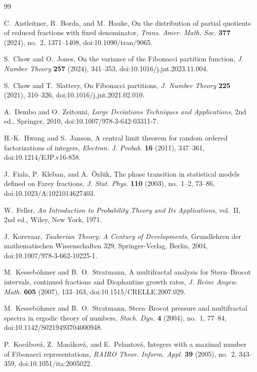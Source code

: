 \begin{thebibliography}{99}

C.~Aistleitner, B.~Borda, and M.~Hauke,
On the distribution of partial quotients of reduced fractions with fixed
denominator,
\textit{Trans. Amer. Math. Soc.} \textbf{377} (2024), no.~2, 1371--1408,
doi:10.1090/tran/9065.

S.~Chow and O.~Jones,
On the variance of the Fibonacci partition function,
\textit{J. Number Theory} \textbf{257} (2024), 341--353,
doi:10.1016/j.jnt.2023.11.004.

S.~Chow and T.~Slattery,
On Fibonacci partitions,
\textit{J. Number Theory} \textbf{225} (2021), 310--326,
doi:10.1016/j.jnt.2021.02.010.

A.~Dembo and O.~Zeitouni,
\textit{Large Deviations Techniques and Applications},
2nd ed., Springer, 2010,
doi:10.1007/978-3-642-03311-7.

H.-K.~Hwang and S.~Janson,
A central limit theorem for random ordered factorizations of integers,
\textit{Electron. J. Probab.} \textbf{16} (2011), 347--361,
doi:10.1214/EJP.v16-858.

J.~Fiala, P.~Kleban, and A.~\"Ozl\"uk,
The phase transition in statistical models defined on Farey fractions,
\textit{J. Stat. Phys.} \textbf{110} (2003), no.~1--2, 73--86,
doi:10.1023/A:1021014627403.

W.~Feller,
\textit{An Introduction to Probability Theory and Its Applications}, vol.~II,
2nd ed., Wiley, New York, 1971.

J.~Korevaar,
\textit{Tauberian Theory: A Century of Developments},
Grundlehren der mathematischen Wissenschaften 329,
Springer-Verlag, Berlin, 2004,
doi:10.1007/978-3-662-10225-1.

M.~Kesseb\"ohmer and B.~O.~Stratmann,
A multifractal analysis for Stern--Brocot intervals, continued fractions and
Diophantine growth rates,
\textit{J. Reine Angew. Math.} \textbf{605} (2007), 133--163,
doi:10.1515/CRELLE.2007.029.

M.~Kesseb\"ohmer and B.~O.~Stratmann,
Stern--Brocot pressure and multifractal spectra in ergodic theory of numbers,
\textit{Stoch. Dyn.} \textbf{4} (2004), no.~1, 77--84,
doi:10.1142/S0219493704000948.

P.~Koc\'abov\'a, Z.~Mas\'akov\'a, and E.~Pelantov\'a,
Integers with a maximal number of Fibonacci representations,
\textit{RAIRO Theor. Inform. Appl.} \textbf{39} (2005), no.~2, 343--359,
doi:10.1051/ita:2005022.


\end{thebibliography}
